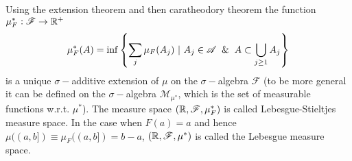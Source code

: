 Using the extension theorem and then caratheodory theorem the function $\mu^*_F: \mathscr{F} \to \mathbb{R}^+$
\[\mu^*_F(A) = \inf\l\{\sum_j \mu_F(A_j)\ |\ A_j \in \mathscr{A} \And A \subset \bigcup_{j\geq1}A_j\r\}\]
is a unique $\sigma-$additive extension of $\mu$ on the $\sigma-$algebra $ \mathscr{F}$ (to be more general it can be defined on the $\sigma-$algebra $ \mathscr{M}_{\mu^*}$, which is the set of measurable functions w.r.t. $\mu^*$). The measure space $(\mathbb{R}, \mathscr{F}, \mu_F^*)$ is called Lebesgue-Stieltjes measure space. In the case when $F(a) = a$ and hence $\mu((a,b]) \equiv \mu_F((a,b]) = b-a$, $(\mathbb{R}, \mathscr{F}, \mu^*)$ is called the Lebesgue measure space.
